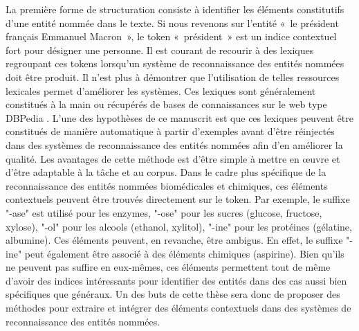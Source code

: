 \documentclass[12pt,a4paper,times,twoside,openright]{report}
\begin{document}
La première forme de structuration consiste à identifier les éléments constitutifs d'une entité nommée dans le texte. Si nous revenons sur l'entité «\ le président français Emmanuel Macron\ », le token «\ président\ » est un indice contextuel fort pour désigner une personne. Il est courant de recourir à des lexiques regroupant ces tokens lorsqu'un système de reconnaissance des entités nommées doit être produit. Il n'est plus à démontrer que l'utilisation de telles ressources lexicales permet d'améliorer les systèmes. Ces lexiques sont généralement constitués à la main ou récupérés de bases de connaissances sur le web type DBPedia \citep{auer2007dbpedia}. L'une des hypothèses de ce manuscrit est que ces lexiques peuvent être constitués de manière automatique à partir d'exemples avant d'être réinjectés dans des systèmes de reconnaissance des entités nommées afin d'en améliorer la qualité. Les avantages de cette méthode est d'être simple à mettre en \oe uvre et d'être adaptable à la tâche et au corpus.
Dans le cadre plus spécifique de la reconnaissance des entités nommées biomédicales et chimiques, ces éléments contextuels peuvent être trouvés directement sur le token. Par exemple, le suffixe "-ase" est utilisé pour les enzymes, "-ose" pour les sucres (glucose, fructose, xylose), "-ol" pour les alcools (ethanol, xylitol), "-ine" pour les protéines (gélatine, albumine). Ces éléments peuvent, en revanche, être ambigus. En effet, le suffixe "-ine" peut également être associé à des éléments chimiques (aspirine). Bien qu'ils ne peuvent pas suffire en eux-mêmes, ces éléments permettent tout de même d'avoir des indices intéressants pour identifier des entités dans des cas aussi bien spécifiques que généraux. Un des buts de cette thèse sera donc de proposer des méthodes pour extraire et intégrer des éléments contextuels dans des systèmes de reconnaissance des entités nommées.
\end{document}
